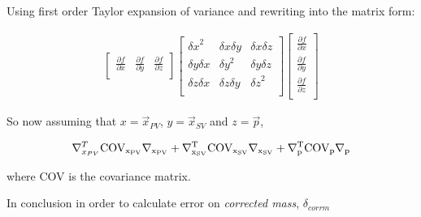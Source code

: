 Using first order Taylor expansion of variance and rewriting into the matrix form:

\begin{equation}
\begin{aligned}
       \begin{bmatrix}
		\frac{\partial{f}}{\partial{x}} & \frac{\partial{f}}{\partial{y}} & \frac{\partial{f}}{\partial{z}} \\
       \end{bmatrix}
       \begin{bmatrix}
	       {\delta x}^{2} & \delta x \delta y & \delta x \delta z  \\ 
	        \delta y \delta x & {\delta y}^{2} & \delta y \delta z  \\
	        \delta z \delta x & \delta z \delta y & {\delta z}^{2}  \\
       \end{bmatrix}
       \begin{bmatrix}
		\frac{\partial{f}}{\partial{x}} \\ \frac{\partial{f}}{\partial{y}} \\\frac{\partial{f}}{\partial{z}} \\
       \end{bmatrix}
\end{aligned}
\end{equation}

So now assuming that $x=\vec{{x}}_{PV}$, $y=\vec{{x}}_{SV}$ and $z=\vec{p}$,

\begin{equation}
\begin{aligned}
       \nabla^{T}_{x_{PV}} \rm{COV_{x_{PV}}} \nabla_{x_{PV}} + \nabla^{T}_{x_{SV}} \rm{COV_{x_{SV}}} \nabla_{x_{SV}} + \nabla^{T}_{p} \rm{COV_{p}} \nabla_{p}
\end{aligned}
\end{equation}

where \rm{COV} is the covariance matrix.

In conclusion in order to calculate error on \textit{corrected mass}, $\delta_{corrm}$


